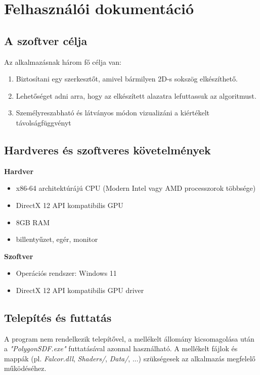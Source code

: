 \chapter{Felhasználói dokumentáció}
\label{ch:user}


\section{A szoftver célja}

Az alkalmazásnak három fő célja van:
\begin{enumerate}
    \item Biztosítani egy szerkesztőt, amivel bármilyen 2D-s sokszög elkészíthető.
    \item Lehetőséget adni arra, hogy az elkészített alazatra lefuttassuk az algoritmust.
    \item Személyreszabható és látványos módon vizualizáni a kiértékelt távolságfüggvényt
\end{enumerate}


\section{Hardveres és szoftveres követelmények}

\textbf{Hardver}
\begin{itemize}
    \item x86-64 architektúrájú CPU (Modern Intel vagy AMD processzorok többsége)
    \item DirectX 12 API kompatibilis GPU
    \item 8GB RAM
    \item billentyűzet, egér, monitor
\end{itemize}

\textbf{Szoftver}
\begin{itemize}
    \item Operációs rendszer: Windows 11
    \item DirectX 12 API kompatibilis GPU driver
\end{itemize}


\section{Telepítés és futtatás}

A program nem rendelkezik telepítővel, a mellékelt állomány kicsomagolása után a \textit{"PolygonSDF.exe"} futtatásával azonnal használható. A mellékelt fájlok és mappák (pl. \textit{Falcor.dll}, \textit{Shaders/}, \textit{Data/}, ...) szükségesek az alkalmazás megfelelő működéséhez.


